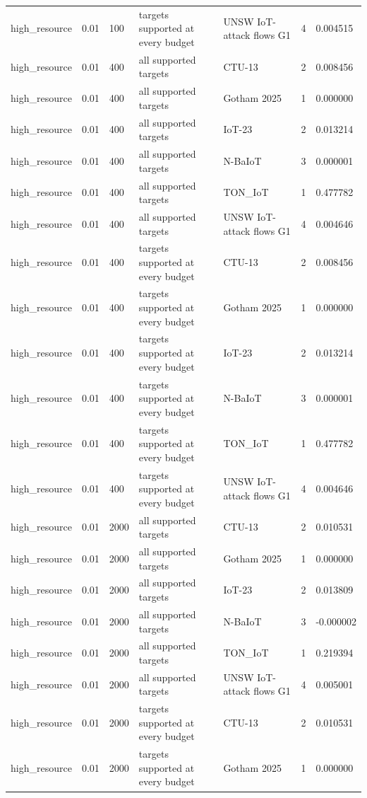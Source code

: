 \begin{tabular}{lllllll}
high\_resource & 0.01 & 100 & targets supported at every budget & UNSW IoT-attack flows G1 & 4 & 0.004515 \\
high\_resource & 0.01 & 400 & all supported targets & CTU-13 & 2 & 0.008456 \\
high\_resource & 0.01 & 400 & all supported targets & Gotham 2025 & 1 & 0.000000 \\
high\_resource & 0.01 & 400 & all supported targets & IoT-23 & 2 & 0.013214 \\
high\_resource & 0.01 & 400 & all supported targets & N-BaIoT & 3 & 0.000001 \\
high\_resource & 0.01 & 400 & all supported targets & TON\_IoT & 1 & 0.477782 \\
high\_resource & 0.01 & 400 & all supported targets & UNSW IoT-attack flows G1 & 4 & 0.004646 \\
high\_resource & 0.01 & 400 & targets supported at every budget & CTU-13 & 2 & 0.008456 \\
high\_resource & 0.01 & 400 & targets supported at every budget & Gotham 2025 & 1 & 0.000000 \\
high\_resource & 0.01 & 400 & targets supported at every budget & IoT-23 & 2 & 0.013214 \\
high\_resource & 0.01 & 400 & targets supported at every budget & N-BaIoT & 3 & 0.000001 \\
high\_resource & 0.01 & 400 & targets supported at every budget & TON\_IoT & 1 & 0.477782 \\
high\_resource & 0.01 & 400 & targets supported at every budget & UNSW IoT-attack flows G1 & 4 & 0.004646 \\
high\_resource & 0.01 & 2000 & all supported targets & CTU-13 & 2 & 0.010531 \\
high\_resource & 0.01 & 2000 & all supported targets & Gotham 2025 & 1 & 0.000000 \\
high\_resource & 0.01 & 2000 & all supported targets & IoT-23 & 2 & 0.013809 \\
high\_resource & 0.01 & 2000 & all supported targets & N-BaIoT & 3 & -0.000002 \\
high\_resource & 0.01 & 2000 & all supported targets & TON\_IoT & 1 & 0.219394 \\
high\_resource & 0.01 & 2000 & all supported targets & UNSW IoT-attack flows G1 & 4 & 0.005001 \\
high\_resource & 0.01 & 2000 & targets supported at every budget & CTU-13 & 2 & 0.010531 \\
high\_resource & 0.01 & 2000 & targets supported at every budget & Gotham 2025 & 1 & 0.000000 \\

\end{tabular}
